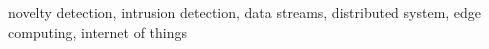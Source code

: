 \documentclass[conference]{IEEEtran}
\newcounter{todocounter}
\begin{document}


\fi

\begin{abstract}
  
\end{abstract}

\begin{IEEEkeywords}
novelty detection, intrusion detection, data streams, distributed system, edge computing, internet of things
\end{IEEEkeywords}



% 


\end{document}
